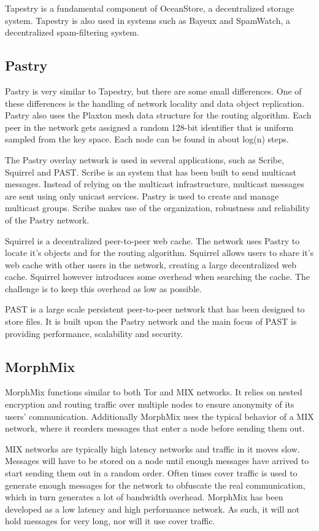 \documentclass{article}
\begin{document}
		Tapestry is a fundamental component of OceanStore, a decentralized storage system. Tapestry is also used in systems such as Bayeux and SpamWatch, a decentralized spam-filtering system.

	\subsection{Pastry} %
		Pastry is very similar to Tapestry, but there are some small differences. One of these differences is the handling of network locality and data object replication. Pastry also uses the Plaxton mesh data structure for the routing algorithm. Each peer in the network gets assigned a random 128-bit identifier that is uniform sampled from the key space. Each node can be found in about log(n) steps.

		The Pastry overlay network is used in several applications, such as Scribe, Squirrel and PAST. Scribe is an system that has been built to send multicast messages. Instead of relying on the multicast infrastructure, multicast messages are sent using only unicast services. Pastry is used to create and manage multicast groups. Scribe makes use of the organization, robustness and reliability of the Pastry network.

		Squirrel is a decentralized peer-to-peer web cache. The network uses Pastry to locate it's objects and for the routing algorithm. Squirrel allows users to share it's web cache with other users in the network, creating a large decentralized web cache. Squirrel however introduces some overhead when searching the cache. The challenge is to keep this overhead as low as possible.

		PAST is a large scale persistent peer-to-peer network that has been designed to store files. It is built upon the Pastry network and the main focus of PAST is providing performance, scalability and security.
			
	\subsection{MorphMix} %
		MorphMix \cite{rennhard2002introducing} functions similar to both Tor and MIX networks. It relies on nested encryption and routing traffic over multiple nodes to ensure anonymity of its users' communication. Additionally MorphMix uses the typical behavior of a MIX network, where it reorders messages that enter a node before sending them out.
		
		MIX networks are typically high latency networks and traffic in it moves slow. Messages will have to be stored on a node until enough messages have arrived to start sending them out in a random order. Often times cover traffic is used to generate enough messages for the network to obfuscate the real communication, which in turn generates a lot of bandwidth overhead. MorphMix has been developed as a low latency and high performance network. As such, it will not hold messages for very long, nor will it use cover traffic.
		
\end{document}
